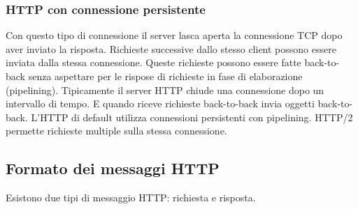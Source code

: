 \subsubsection{HTTP con connessione persistente}
Con questo tipo di connessione il server lasca aperta la connessione TCP dopo aver inviato la risposta. Richieste successive dallo stesso client possono essere inviata dalla stessa connessione. Queste richieste
possono essere fatte back-to-back senza aspettare per le rispose di richieste in fase di elaborazione (pipelining). Tipicamente il server HTTP chiude una connessione dopo un intervallo di tempo. E quando riceve
richieste back-to-back invia oggetti back-to-back. L'HTTP di default utilizza connessioni persistenti con pipelining. HTTP/2 permette richieste multiple sulla stessa connessione. 
\subsection{Formato dei messaggi HTTP}
Esistono due tipi di messaggio HTTP: richiesta e risposta.

